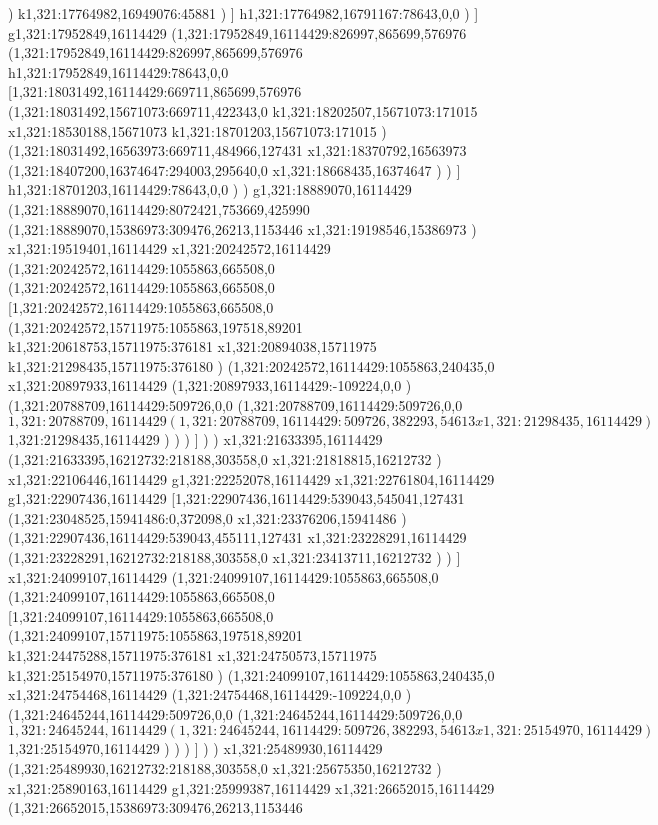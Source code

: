 {)
k1,321:17764982,16949076:45881
)
]
h1,321:17764982,16791167:78643,0,0
)
]
g1,321:17952849,16114429
(1,321:17952849,16114429:826997,865699,576976
(1,321:17952849,16114429:826997,865699,576976
h1,321:17952849,16114429:78643,0,0
[1,321:18031492,16114429:669711,865699,576976
(1,321:18031492,15671073:669711,422343,0
k1,321:18202507,15671073:171015
x1,321:18530188,15671073
k1,321:18701203,15671073:171015
)
(1,321:18031492,16563973:669711,484966,127431
x1,321:18370792,16563973
(1,321:18407200,16374647:294003,295640,0
x1,321:18668435,16374647
)
)
]
h1,321:18701203,16114429:78643,0,0
)
)
g1,321:18889070,16114429
(1,321:18889070,16114429:8072421,753669,425990
(1,321:18889070,15386973:309476,26213,1153446
x1,321:19198546,15386973
)
x1,321:19519401,16114429
x1,321:20242572,16114429
(1,321:20242572,16114429:1055863,665508,0
(1,321:20242572,16114429:1055863,665508,0
[1,321:20242572,16114429:1055863,665508,0
(1,321:20242572,15711975:1055863,197518,89201
k1,321:20618753,15711975:376181
x1,321:20894038,15711975
k1,321:21298435,15711975:376180
)
(1,321:20242572,16114429:1055863,240435,0
x1,321:20897933,16114429
(1,321:20897933,16114429:-109224,0,0
)
(1,321:20788709,16114429:509726,0,0
(1,321:20788709,16114429:509726,0,0
$1,321:20788709,16114429
(1,321:20788709,16114429:509726,382293,54613
x1,321:21298435,16114429
)
$1,321:21298435,16114429
)
)
)
]
)
)
x1,321:21633395,16114429
(1,321:21633395,16212732:218188,303558,0
x1,321:21818815,16212732
)
x1,321:22106446,16114429
g1,321:22252078,16114429
x1,321:22761804,16114429
g1,321:22907436,16114429
[1,321:22907436,16114429:539043,545041,127431
(1,321:23048525,15941486:0,372098,0
x1,321:23376206,15941486
)
(1,321:22907436,16114429:539043,455111,127431
x1,321:23228291,16114429
(1,321:23228291,16212732:218188,303558,0
x1,321:23413711,16212732
)
)
]
x1,321:24099107,16114429
(1,321:24099107,16114429:1055863,665508,0
(1,321:24099107,16114429:1055863,665508,0
[1,321:24099107,16114429:1055863,665508,0
(1,321:24099107,15711975:1055863,197518,89201
k1,321:24475288,15711975:376181
x1,321:24750573,15711975
k1,321:25154970,15711975:376180
)
(1,321:24099107,16114429:1055863,240435,0
x1,321:24754468,16114429
(1,321:24754468,16114429:-109224,0,0
)
(1,321:24645244,16114429:509726,0,0
(1,321:24645244,16114429:509726,0,0
$1,321:24645244,16114429
(1,321:24645244,16114429:509726,382293,54613
x1,321:25154970,16114429
)
$1,321:25154970,16114429
)
)
)
]
)
)
x1,321:25489930,16114429
(1,321:25489930,16212732:218188,303558,0
x1,321:25675350,16212732
)
x1,321:25890163,16114429
g1,321:25999387,16114429
x1,321:26652015,16114429
(1,321:26652015,15386973:309476,26213,1153446
}
